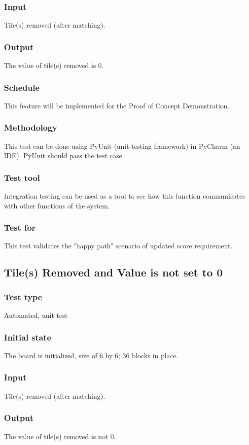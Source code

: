 \documentclass[12pt]{article}
\begin{document}
\subsubsection{Input}
Tile(s) removed (after matching).
\subsubsection{Output}
The value of tile(s) removed is 0.
\subsubsection{Schedule}
This feature will be implemented for the Proof of Concept Demonstration.
\subsubsection{Methodology}
This test can be done using PyUnit (unit-testing framework) in PyCharm (an IDE). PyUnit should pass the test case.
\subsubsection{Test tool}
Integration testing can be used as a tool to see how this function communicates with other functions of the system.
\subsubsection{Test for}
This test validates the "happy path" scenario of updated score requirement. 

\newpage

\subsection{Tile(s) Removed and Value is not set to 0}
\subsubsection{Test type}
Automated, unit test
\subsubsection{Initial state}
The board is initialized, size of 6 by 6; 36 blocks in place.
\subsubsection{Input}
Tile(s) removed (after matching).
\subsubsection{Output}
The value of tile(s) removed is not 0.
\end{document}

